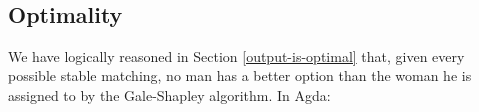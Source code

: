 {\begin{code}%
\>[0]\AgdaSpace{}%
\AgdaSymbol{:}%
\>[3391I]\AgdaSpace{}%
\AgdaSymbol{(}\AgdaSpace{}%
\AgdaSpace{}%
\AgdaSymbol{:}\AgdaSpace{}%
\AgdaSymbol{)}\AgdaSpace{}%
\<%
\\
\>[.][@{}l@{}]\<[3391I]%
\>[19]\AgdaSpace{}%
\AgdaSpace{}%
\AgdaSpace{}%
\AgdaSpace{}%
\<%
\\
%
\>[19]\AgdaSpace{}%
\AgdaSpace{}%
\AgdaSpace{}%
\AgdaInductiveConstructor{[]}\AgdaSpace{}%
\<%
\\
%
\>[19]\AgdaSpace{}%
\<%
\\
\>[0]\AgdaSpace{}%
\AgdaSpace{}%
\AgdaSpace{}%
\AgdaSpace{}%
\AgdaSpace{}%
\AgdaSymbol{=}\AgdaSpace{}%
\AgdaSpace{}%
\AgdaOperator{\AgdaInductiveConstructor{,}}\AgdaSpace{}%
\AgdaSymbol{\{!!\}}\<%
\end{code}

\subsection{Optimality}

We have logically reasoned in Section \ref{output-is-optimal} that, given every possible stable matching, no man has a better option than the woman he is assigned to by the Gale-Shapley algorithm. In Agda:

}

